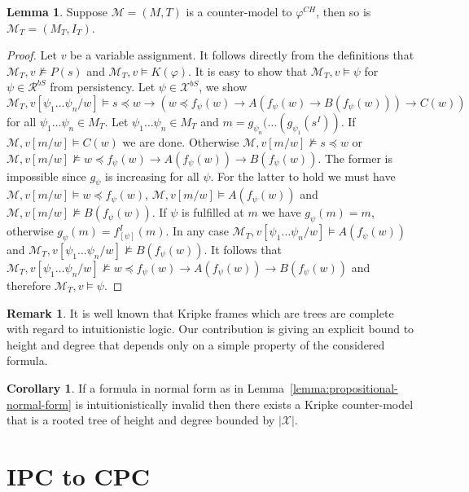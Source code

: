 \documentclass{easychair}
\theoremstyle{definition}
\theoremstyle{definition}
\newtheorem{corollary}[theorem]{Corollary}
\theoremstyle{definition}
\newtheorem{lemma}[theorem]{Lemma}
\theoremstyle{definition}
\theoremstyle{definition}
\theoremstyle{definition}
\theoremstyle{definition}
\newtheorem{remark}[theorem]{Remark}
\begin{document}
\begin{lemma}
	Suppose $\mathcal M = (M, T)$ is a counter-model to $\varphi^{CH}$, then so is $\mathcal M_T = (M_T, I_T)$.
\end{lemma}
\begin{proof}
	Let $v$ be a variable assignment. It follows directly from the definitions that $\mathcal M_T, v\not\models P(s)$ and $\mathcal M_T, v\models K(\varphi)$. It is easy to show that $\mathcal M_T, v\models \psi$ for $\psi\in\mathcal R^{bS}$ from persistency. Let $\psi\in\mathcal X^{bS}$, we show $\mathcal M_T, v[\psi_1\dots\psi_n/w] \models s\preceq w\to (w\preceq f_\psi(w)\to A(f_\psi(w)\to B(f_\psi(w)))\to C(w))$ for all $\psi_1\dots\psi_n\in M_T$. Let $\psi_1\dots\psi_n\in M_T$ and $m = g_{\psi_n}(\dots(g_{\psi_1}(s^I))$. If $\mathcal M, v[m/w]\models C(w)$ we are done. Otherwise $\mathcal M, v[m/w]\not\models s\preceq w$ or $\mathcal M, v[m/w]\not\models w\preceq f_\psi(w)\to A(f_\psi(w)) \to B(f_\psi(w))$. The former is impossible since $g_\psi$ is increasing for all $\psi$. For the latter to hold we must have $\mathcal M, v[m/w]\models w\preceq f_\psi(w)$, $\mathcal M, v[m/w]\models A(f_\psi(w))$ and $\mathcal M, v[m/w]\not\models B(f_\psi(w))$. If $\psi$ is fulfilled at $m$ we have $g_\psi(m) = m$, otherwise $g_\psi(m) = f_{[\psi]}^I(m)$. In any case $\mathcal M_T, v[\psi_1\dots\psi_n/w]\models A(f_\psi(w))$ and $\mathcal M_T, v[\psi_1\dots\psi_n/w]\not\models B(f_\psi(w))$. It follows that $\mathcal M_T, v[\psi_1\dots\psi_n/w]\not\models w\preceq f_\psi(w)\to A(f_\psi(w))\to B(f_\psi(w))$ and therefore $\mathcal M_T, v\models \psi$.
\end{proof}

\begin{remark}
	It is well known that Kripke frames which are trees are complete with regard to intuitionistic logic. Our contribution is giving an explicit bound to height and degree that depends only on a simple property of the considered formula.
\end{remark}

\begin{corollary}
	If a formula in normal form as in Lemma~\ref{lemma:propositional-normal-form} is intuitionistically invalid then there exists a Kripke counter-model that is a rooted tree of height and degree bounded by $|\mathcal X|$.
\end{corollary}

\section{IPC to CPC}
\label{sec:ipc-to-cpc}
\end{document}
